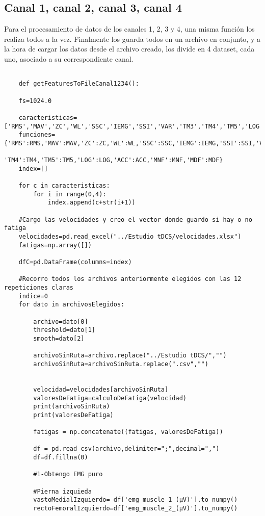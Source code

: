     \subsection{Canal 1, canal 2, canal 3, canal 4}
    Para el procesamiento de datos de los canales 1, 2, 3 y 4, una misma función los realiza todos a la vez. Finalmente los guarda todos en un archivo en conjunto, y a la hora de cargar los datos desde el archivo creado, los divide en 4 dataset, cada uno, asociado a su correspondiente canal.
    \begin{lstlisting}
    
    def getFeaturesToFileCanal1234():
    
    fs=1024.0
    
    caracteristicas=['RMS','MAV','ZC','WL','SSC','IEMG','SSI','VAR','TM3','TM4','TM5','LOG','ACC','MNF','MDF']
    funciones={'RMS':RMS,'MAV':MAV,'ZC':ZC,'WL':WL,'SSC':SSC,'IEMG':IEMG,'SSI':SSI,'VAR':VAR,'TM3':TM3,
               'TM4':TM4,'TM5':TM5,'LOG':LOG,'ACC':ACC,'MNF':MNF,'MDF':MDF}
    index=[]

    for c in caracteristicas:
        for i in range(0,4):
            index.append(c+str(i+1))
       
    #Cargo las velocidades y creo el vector donde guardo si hay o no fatiga
    velocidades=pd.read_excel("../Estudio tDCS/velocidades.xlsx")
    fatigas=np.array([])
    
    dfC=pd.DataFrame(columns=index)
    
    #Recorro todos los archivos anteriormente elegidos con las 12 repeticiones claras
    indice=0
    for dato in archivosElegidos:
        
        archivo=dato[0]
        threshold=dato[1]
        smooth=dato[2]
        
        archivoSinRuta=archivo.replace("../Estudio tDCS/","")
        archivoSinRuta=archivoSinRuta.replace(".csv","")
        
        
        velocidad=velocidades[archivoSinRuta]
        valoresDeFatiga=calculoDeFatiga(velocidad)
        print(archivoSinRuta)
        print(valoresDeFatiga)
        
        fatigas = np.concatenate((fatigas, valoresDeFatiga))
        
        df = pd.read_csv(archivo,delimiter=";",decimal=",")
        df=df.fillna(0)

        #1-Obtengo EMG puro 
        
        #Pierna izquieda
        vastoMedialIzquierdo= df['emg_muscle_1_(µV)'].to_numpy()
        rectoFemoralIzquierdo=df['emg_muscle_2_(µV)'].to_numpy()


\end{lstlisting}

